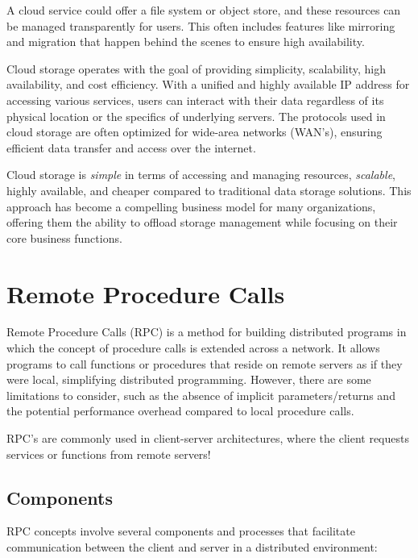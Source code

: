 \documentclass{report}
\newcommand{\exampleBegin}[1]{\begin{tcolorbox}[colback=blue!5!white,colframe=black!75!blue,title={Example:
      #1}]}
\newcommand{\exampleEnd}{\end{tcolorbox}}
\begin{document}
\exampleBegin{On a Cloud}
A cloud service could offer a file system or object store, and these resources can be managed
transparently for users. This often includes features like mirroring and migration that happen
behind the scenes to ensure high availability.
\exampleEnd

Cloud storage operates with the goal of providing simplicity, scalability, high availability, and
cost efficiency. With a unified and highly available IP address for accessing various services,
users can interact with their data regardless of its physical location or the specifics of
underlying servers. The protocols used in cloud storage are often optimized for wide-area networks
(WAN's), ensuring efficient data transfer and access over the internet.

Cloud storage is \textit{simple} in terms of accessing and managing resources, \textit{scalable},
highly available, and cheaper compared to traditional data storage solutions. This approach has
become a compelling business model for many organizations, offering them the ability to offload
storage management while focusing on their core business functions.





\section{Remote Procedure Calls}
Remote Procedure Calls (RPC) is a method for building distributed programs in which the concept of
procedure calls is extended across a network. It allows programs to call functions or procedures
that reside on remote servers as if they were local, simplifying distributed programming. However,
there are some limitations to consider, such as the absence of implicit parameters/returns and the
potential performance overhead compared to local procedure calls. 

\exampleBegin{Client-Server}
RPC's are commonly used in client-server architectures, where the client requests services or
functions from remote servers!
\exampleEnd


\subsection{Components}
RPC concepts involve several components and processes that facilitate communication between the
client and server in a distributed environment:
\end{document}
